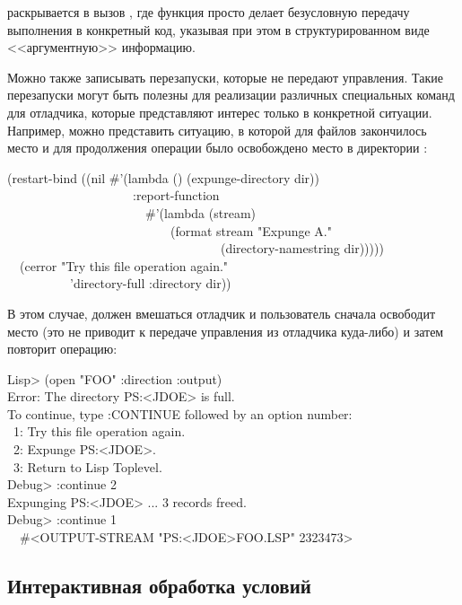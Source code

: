  раскрывается в вызов , где функция просто
делает безусловную передачу выполнения в конкретный код, указывая при этом в
структурированном виде <<аргументную>> информацию.

Можно также записывать перезапуски, которые не передают управления. Такие
перезапуски могут быть полезны для реализации различных специальных команд для
отладчика, которые представляют интерес только в конкретной ситуации. Например,
можно представить ситуацию, в которой для файлов закончилось место и для
продолжения операции было освобождено место в директории :
\begin{lisp}
(restart-bind ((nil \#'(lambda () (expunge-directory dir)) \\
~~~~~~~~~~~~~~~~~~~~:report-function \\
~~~~~~~~~~~~~~~~~~~~~~\#'(lambda (stream) \\
~~~~~~~~~~~~~~~~~~~~~~~~~~(format stream "Expunge {\Xtilde}A." \\
~~~~~~~~~~~~~~~~~~~~~~~~~~~~~~~~~~(directory-namestring dir))))) \\
~~(cerror "Try this file operation again." \\
~~~~~~~~~~'directory-full :directory dir))
\end{lisp}
В этом случае, должен вмешаться отладчик и пользователь сначала освободит место
(это не приводит к передаче управления из отладчика куда-либо) и затем повторит операцию:
\begin{lisp}
Lisp> (open "FOO" :direction :output) \\
Error: The directory PS:<JDOE> is full. \\
To continue, type :CONTINUE followed by an option number: \\
~1: Try this file operation again. \\
~2: Expunge PS:<JDOE>. \\
~3: Return to Lisp Toplevel. \\
Debug> :continue 2 \\
Expunging PS:<JDOE> ... 3 records freed. \\
Debug> :continue 1 \\
~\EV\ \#<OUTPUT-STREAM "PS:<JDOE>FOO.LSP" 2323473>
\end{lisp}

\subsection{Интерактивная обработка условий}

